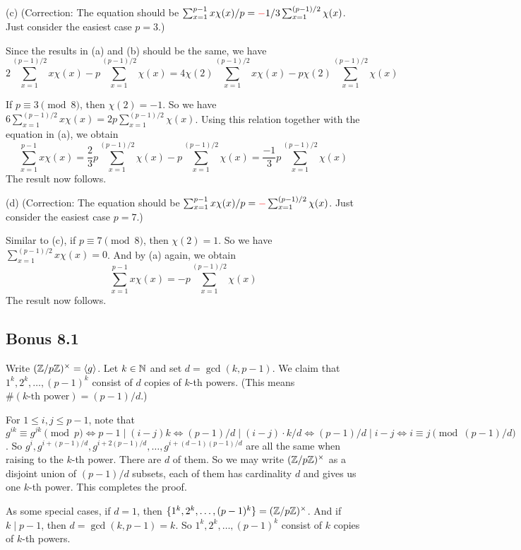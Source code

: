 \documentclass[../I&R.tex]{subfiles}
\begin{document}
(c) (Correction: The equation should be $\sum_{x=1}^{p-1}x\chi(x)/p={\color{red}-}1/3\sum_{x=1}^{(p-1)/2} \chi(x)$. Just consider the easiest case $p=3$.)

Since the results in (a) and (b) should be the same, we have $$2\sum_{x=1}^{(p-1)/2} x\chi(x) - p\sum_{x=1}^{(p-1)/2} \chi(x) = 4\chi(2)\sum_{x=1}^{(p-1)/2} x\chi(x) - p\chi(2)\sum_{x=1}^{(p-1)/2} \chi(x)$$

If $p\equiv3\pmod{8}$, then $\chi(2)=-1$. So we have $6\sum_{x=1}^{(p-1)/2} x\chi(x) = 2p\sum_{x=1}^{(p-1)/2} \chi(x)$. Using this relation together with the equation in (a), we obtain $$\sum_{x=1}^{p-1} x\chi(x) = \frac{2}{3}p\sum_{x=1}^{(p-1)/2} \chi(x) - p\sum_{x=1}^{(p-1)/2} \chi(x) = \frac{-1}{3}p\sum_{x=1}^{(p-1)/2} \chi(x)$$ The result now follows.

(d) (Correction: The equation should be $\sum_{x=1}^{p-1}x\chi(x)/p={\color{red}-}\sum_{x=1}^{(p-1)/2} \chi(x)$. Just consider the easiest case $p=7$.)

Similar to (c), if $p\equiv7\pmod{8}$, then $\chi(2)=1$. So we have $\sum_{x=1}^{(p-1)/2} x\chi(x)=0$. And by (a) again, we obtain $$\sum_{x=1}^{p-1} x\chi(x) = -p\sum_{x=1}^{(p-1)/2} \chi(x)$$ The result now follows.

\subsection*{Bonus 8.1} \label{Bonus 8.1}

Write $(\mathbb{Z}/p\mathbb{Z})^\times=\langle g\rangle$. Let $k\in\mathbb{N}$ and set $d=\gcd(k,p-1)$. We claim that $1^k,2^k,\ldots,(p-1)^k$ consist of $d$ copies of $k$-th powers. (This means $\#(k\text{-th power})=(p-1)/d$.)

For $1\leq i,j\leq p-1$, note that $g^{ik}\equiv g^{jk} \pmod{p} \iff p-1\mid (i-j)k \iff (p-1)/d\mid (i-j)\cdot k/d \iff (p-1)/d\mid i-j \iff i\equiv j \pmod{(p-1)/d}$. So $g^i,g^{i+(p-1)/d},g^{i+2(p-1)/d},\ldots,g^{i+(d-1)(p-1)/d}$ are all the same when raising to the $k$-th power. There are $d$ of them. So we may write $(\mathbb{Z}/p\mathbb{Z})^\times$ as a disjoint union of $(p-1)/d$ subsets, each of them has cardinality $d$ and gives us one $k$-th power. This completes the proof.

As some special cases, if $d=1$, then $\{1^k,2^k,\ldots,(p-1)^k\}=(\mathbb{Z}/p\mathbb{Z})^\times$. And if $k\mid p-1$, then $d=\gcd(k,p-1)=k$. So $1^k,2^k,\ldots,(p-1)^k$ consist of $k$ copies of $k$-th powers.
\end{document}
